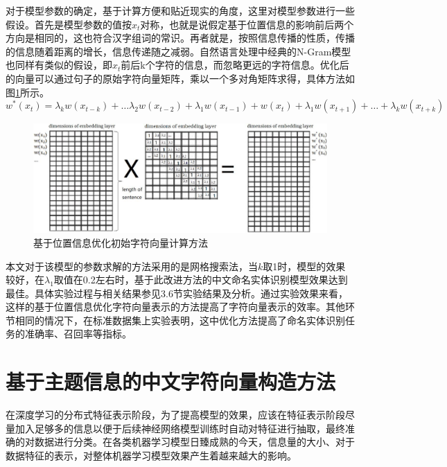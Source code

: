 \documentclass[winfonts,master,oneside,nobackinfo]{njuthesis}
\begin{document}
对于模型参数的确定，基于计算方便和贴近现实的角度，这里对模型参数进行一些假设。首先是模型参数的值按$x_{t}$对称，也就是说假定基于位置信息的影响前后两个方向是相同的，这也符合汉字组词的常识。再者就是，按照信息传播的性质，传播的信息随着距离的增长，信息传递随之减弱。自然语言处理中经典的N-Gram模型也同样有类似的假设，即$x_{t}$前后k个字符的信息，而忽略更远的字符信息。优化后的向量可以通过句子的原始字符向量矩阵，乘以一个多对角矩阵求得，具体方法如图\ref{modify-site}所示。
\begin{equation}
w^{*}\left(x_{t}\right)=\lambda_{k} w\left(x_{t-k}\right)+\ldots \lambda_{2}w\left(x_{t-2}\right)+\lambda_{1} w\left(x_{t-1}\right)+ w\left(x_{t}\right)+\lambda_{1} w\left(x_{t+1}\right)+\ldots+\lambda_{k} w\left(x_{t+k}\right)
\end{equation}
\begin{figure}[h]
\centering
\includegraphics[width=1.04\textwidth]{./figure/基于位置信息变化.jpg}
\caption{基于位置信息优化初始字符向量计算方法}
\label{modify-site}
\end{figure}

本文对于该模型的参数求解的方法采用的是网格搜索法，当$k$取1时，模型的效果较好，在$\lambda_{1}$取值在0.2左右时，基于此改进方法的中文命名实体识别模型效果达到最佳。具体实验过程与相关结果参见3.6节实验结果及分析。通过实验效果来看，这样的基于位置信息优化字符向量表示的方法提高了字符向量表示的效率。其他环节相同的情况下，在标准数据集上实验表明，这中优化方法提高了命名实体识别任务的准确率、召回率等指标。

\section{基于主题信息的中文字符向量构造方法}

在深度学习的分布式特征表示阶段，为了提高模型的效果，应该在特征表示阶段尽量加入足够多的信息以便于后续神经网络模型训练时自动对特征进行抽取，最终准确的对数据进行分类。在各类机器学习模型日臻成熟的今天，信息量的大小、对于数据特征的表示，对整体机器学习模型效果产生着越来越大的影响。
\end{document}
